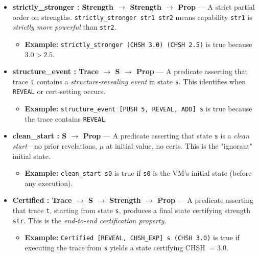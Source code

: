 \begin{itemize}
    \item \textbf{strictly\_stronger : Strength $\to$ Strength $\to$ Prop} — A strict partial order on strengths. \texttt{strictly\_stronger str1 str2} means capability \texttt{str1} is \textit{strictly more powerful} than \texttt{str2}.
    \begin{itemize}
        \item \textbf{Example:} \texttt{strictly\_stronger (CHSH 3.0) (CHSH 2.5)} is true because $3.0 > 2.5$.
    \end{itemize}
    
    \item \textbf{structure\_event : Trace $\to$ S $\to$ Prop} — A predicate asserting that trace \texttt{t} contains a \textit{structure-revealing event} in state \texttt{s}. This identifies when \texttt{REVEAL} or cert-setting occurs.
    \begin{itemize}
        \item \textbf{Example:} \texttt{structure\_event [PUSH 5, REVEAL, ADD] s} is true because the trace contains \texttt{REVEAL}.
    \end{itemize}
    
    \item \textbf{clean\_start : S $\to$ Prop} — A predicate asserting that state \texttt{s} is a \textit{clean start}---no prior revelations, $\mu$ at initial value, no certs. This is the "ignorant" initial state.
    \begin{itemize}
        \item \textbf{Example:} \texttt{clean\_start s0} is true if \texttt{s0} is the VM's initial state (before any execution).
    \end{itemize}
    
    \item \textbf{Certified : Trace $\to$ S $\to$ Strength $\to$ Prop} — A predicate asserting that trace \texttt{t}, starting from state \texttt{s}, produces a final state certifying strength \texttt{str}. This is the \textit{end-to-end certification property}.
    \begin{itemize}
        \item \textbf{Example:} \texttt{Certified [REVEAL, CHSH\_EXP] s (CHSH 3.0)} is true if executing the trace from \texttt{s} yields a state certifying CHSH $= 3.0$.
    \end{itemize}
\end{itemize}

